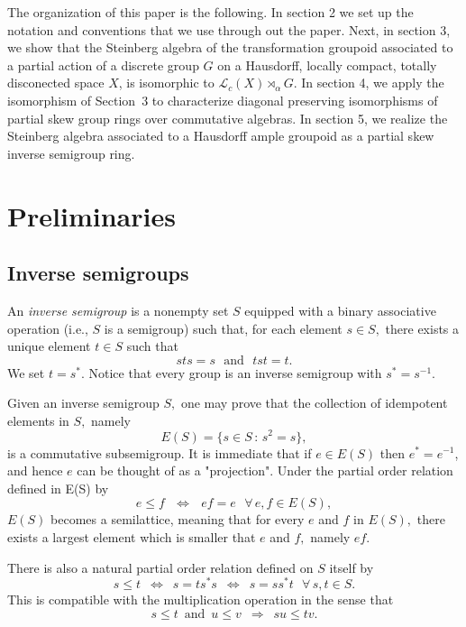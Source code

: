 \documentclass[11pt, a4paper]{amsart}
\newcommand{\Lg}{\ensuremath {\mathcal{L}_c(X)\rtimes_{\alpha} G}}
\theoremstyle{plain}
\begin{document}
The organization of this paper is the following. In section 2 we set up the notation and conventions that we use through out the paper. Next, in section 3, we show that the Steinberg algebra of the transformation groupoid associated to a partial action of a discrete group $G$ on a Hausdorff, locally compact, totally disconected space $X$, is isomorphic to $\Lg.$ In section 4, we apply the isomorphism of Section~3 to characterize diagonal preserving isomorphisms of partial skew group rings over commutative algebras.  In section 5, we realize the Steinberg algebra associated to a Hausdorff ample groupoid as a partial skew inverse semigroup ring. 






\section{Preliminaries}

\subsection{Inverse semigroups}
An \emph{inverse semigroup} is a nonempty set $S$ equipped with a binary associative operation (i.e., $S$ is a semigroup) such that, for each element $s \in  S,$ there exists a unique element $t \in S$ such that
$$ sts=s \,\,\,\, \mbox{and} \,\,\,\, tst=t.$$
We set $t = s^*.$ Notice that every group is an inverse semigroup with $s^*=s^{-1}.$ 

Given an inverse semigroup $S,$ one may prove that the collection of idempotent elements in $S,$ namely
$$ E(S) = \{ s \in S \, : \, s^2=s \},$$
is a commutative subsemigroup. It is immediate that if $e \in E(S)$  then $e^*=e^{-1}$, and hence $e$ can be thought of as a "projection". Under the partial order relation defined in E(S) by
$$e \leq f  \,\,\,\, \Leftrightarrow  \,\,\,\,  ef = e  \,\,\,\, \forall \, e, f \in  E(S),$$
$E(S)$ becomes a semilattice, meaning that for every $e$ and $f$ in $E(S),$ there exists a largest element which is smaller that $e$ and $f,$ namely $ef.$

There is also a natural partial order relation defined on $S$ itself by
\begin{equation}\label{semigrouporder}
s \leq t  \,\,\, \Leftrightarrow \,\,\, s= ts^*s \,\,\, \Leftrightarrow \,\,\, s=ss^*t \,\,\,\, \forall \, s, t \in S.
\end{equation}
This is compatible with the multiplication operation in the sense that
$$ s \leq t \,\,\, \mbox{and} \,\,\, u \leq v \,\,\, \Rightarrow \,\,\, su \leq tv. $$
\end{document}
